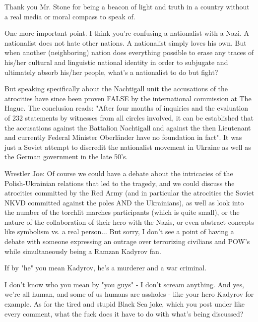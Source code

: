 \begin{itemize}

Thank you Mr. Stone for being a beacon of light and truth in a country without
a real media or moral compass to speak of.


One more important point. I think you're confusing a nationalist with a Nazi. A
nationalist does not hate other nations. A nationalist simply loves his own.
But when another (neighboring) nation does everything possible to erase any
traces of his/her cultural and linguistic national identity in order to
subjugate and ultimately absorb his/her people, what's a nationalist to do but
fight?

But speaking specifically about the Nachtigall unit the accusations of the
atrocities have since been proven FALSE by the international commission at The
Hague. The conclusion reads: "After four months of inquiries and the evaluation
of 232 statements by witnesses from all circles involved, it can be established
that the accusations against the Battalion Nachtigall and against the then
Lieutenant and currently Federal Minister Oberländer have no foundation in
fact". It was just a Soviet attempt to discredit the nationalist movement in
Ukraine as well as the German government in the late 50's.

\begin{itemize} %

Wrestler Joe: Of course we could have a debate about the intricacies of the
Polish-Ukrainian relations that led to the tragedy, and we could discuss the
atrocities committed by the Red Army (and in particular the atrocities the
Soviet NKVD committed against the poles AND the Ukrainians), as well as look
into the number of the torchlit marches participants (which is quite small), or
the nature of the collaboration of their hero with the Nazis, or even abstract
concepts like symbolism vs. a real person... But sorry, I don't see a point of
having a debate with someone expressing an outrage over terrorizing civilians
and POW's while simultaneously being a Ramzan Kadyrov fan.


If by "he" you mean Kadyrov, he's a murderer and a war criminal.


I don't know who you mean by "you guys" - I don't scream anything. And yes,
we're all human, and some of us humans are assholes - like your hero Kadyrov
for example. As for the tired and stupid Black Sea joke, which you post under
like every comment, what the fuck does it have to do with what's being
discussed?


\end{itemize}
\end{itemize}
